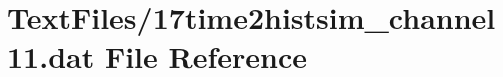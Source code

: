 \hypertarget{17time2histsim__channel11_8dat}{}\section{Text\+Files/17time2histsim\+\_\+channel11.dat File Reference}
\label{17time2histsim__channel11_8dat}
